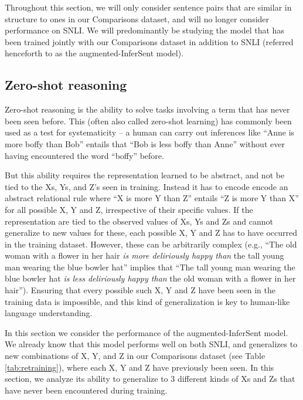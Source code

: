 Throughout this section, we will only consider sentence pairs that are similar in structure to ones in our Comparisons dataset, and will no longer consider performance on SNLI. We will predominantly be studying the model that has been trained jointly with our Comparisons dataset in addition to SNLI (referred henceforth to as the augmented-InferSent model).


\subsection{Zero-shot reasoning}
Zero-shot reasoning is the ability to solve tasks involving a term that has never been seen before. This (often also called zero-shot learning) has commonly been used as a test for systematicity \citep{lake18} -- a human can carry out inferences like ``Anne is more boffy than Bob'' entails that ``Bob is less boffy than Anne'' without ever having encountered the word ``boffy'' before. 

But this ability requires the representation learned to be abstract, and not be tied to the Xs, Ys, and Z's seen in training. Instead it has to encode encode an abstract relational rule where ``X is more Y than Z'' entails ``Z is more Y than X'' for all possible X, Y and Z, irrespective of their specific values. If the representation are tied to the observed values of Xs, Ys and Zs and cannot generalize to new values for these, each possible X, Y and Z has to have occurred in the training dataset. However, these can be arbitrarily complex (e.g., ``The old woman with a flower in her hair \textit{is more deliriously happy than} the tall young man wearing the blue bowler hat'' implies that ``The tall young man wearing the blue bowler hat \textit{is less deliriously happy than} the old woman with a flower in her hair''). Ensuring that every possible such X, Y and Z have been seen in the training data is impossible, and this kind of generalization is key to human-like language understanding.

In this section we consider the performance of the augmented-InferSent model. We already know that this model performs well on both SNLI, and generalizes to new combinations of X, Y, and Z in our Comparisons dataset (see Table \ref{tab:retraining}), where each X, Y and Z have previously been seen. In this section, we analyze its ability to generalize to 3 different kinds of Xs and Zs that have never been encountered during training.

